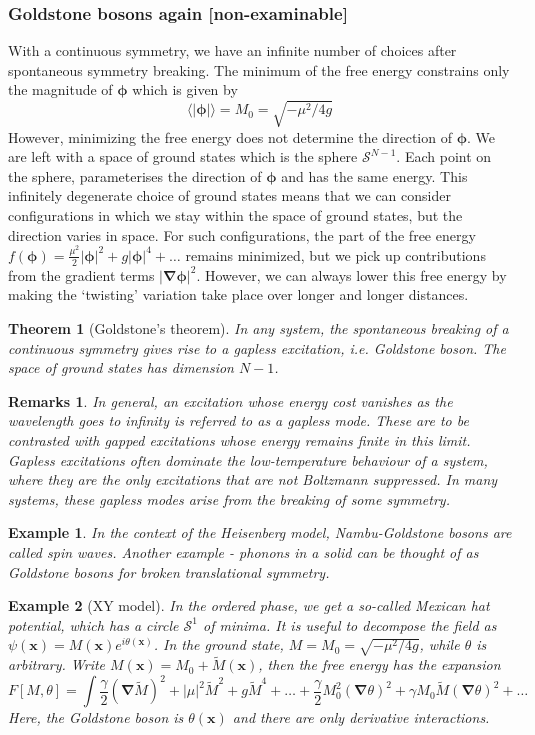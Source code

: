 \documentclass[a4paper]{article}
\newtheorem{remarks}{Remarks}[section]
\newtheorem{eg}{Example}[section]
\theoremstyle{new}
\newtheorem{thm}{Theorem}[section]
\begin{document}
\subsubsection{Goldstone bosons again [non-examinable]}
With a continuous symmetry, we have an infinite number of choices after spontaneous symmetry breaking. The minimum of the free energy constrains only the magnitude of $\boldsymbol{\phi}$ which is given by
$$\langle|\boldsymbol{\phi}|\rangle=M_0=\sqrt{-\mu^2/4g}$$
However, minimizing the free energy does not determine the direction of $\boldsymbol{\phi}$. We are left with a space of ground states which is the sphere $\mathcal{S}^{N-1}$. Each point on the sphere, parameterises the direction of $\boldsymbol{\phi}$ and has the same energy. This infinitely degenerate choice of ground states means that we can consider configurations in which we stay within the space of ground states, but the direction varies in space. For such configurations, the part of the free energy $f(\boldsymbol{\phi})=\frac{\mu^2}{2}|\boldsymbol{\phi}|^2+g|\boldsymbol{\phi}|^4+\dots$ remains minimized, but we pick up contributions from the gradient terms $|\boldsymbol{\nabla}\boldsymbol{\phi}|^2$. However, we can always lower this free energy by making the `twisting' variation take place over longer and longer distances.
\begin{thm}[Goldstone's theorem]
In any system, the spontaneous breaking of a continuous symmetry gives rise to a gapless excitation, i.e. Goldstone boson. The space of ground states has dimension $N-1$.
\end{thm}
\begin{remarks}
In general, an excitation whose energy cost vanishes as the wavelength goes to infinity is referred to as a gapless mode. These are to be contrasted with gapped excitations whose energy remains finite in this limit. Gapless excitations often dominate the low-temperature behaviour of a system, where they are the only excitations that are not Boltzmann suppressed. In many systems, these gapless modes arise from the breaking of some symmetry.
\end{remarks}
\begin{eg}
In the context of the Heisenberg model, Nambu-Goldstone bosons are called spin waves. Another example - phonons in a solid can be thought of as Goldstone bosons for broken translational symmetry.
\end{eg}
\begin{eg}[XY model]
In the ordered phase, we get a so-called Mexican hat potential, which has a circle $\mathcal{S}^1$ of minima. It is useful to decompose the field as $\psi(\mathbf{x})=M(\mathbf{x})e^{i\theta(\mathbf{x})}$. In the ground state, $M=M_0=\sqrt{-\mu^2/4g}$, while $\theta$ is arbitrary. Write $M(\mathbf{x})=M_0+\tilde{M}(\mathbf{x})$, then the free energy has the expansion
$$F[M,\theta]=\int\frac{\gamma}{2}(\boldsymbol{\nabla}\tilde{M})^2+|\mu|^2\tilde{M}^2+g\tilde{M}^4+\dots+\frac{\gamma}{2}M_0^2(\boldsymbol{\nabla}\theta)^2+\gamma M_0\tilde{M}(\boldsymbol{\nabla}\theta)^2+\dots$$
Here, the Goldstone boson is $\theta(\mathbf{x})$ and there are only derivative interactions.
\end{eg}
\end{document}

